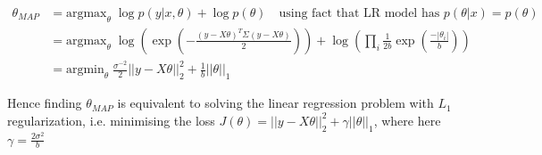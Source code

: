 %
%
\begin{answer}
\begin{align*}
\theta_{MAP} &= \text{argmax}_\theta\;  \log p(y | x, \theta) + \log p(\theta) \quad \text{using fact that LR model has } p(\theta | x) = p(\theta) 
\\
&= \text{argmax}_\theta\; \log \left( \exp(-\frac{(y - X \theta)^T \Sigma (y - X \theta)}{2}) \right ) + \log ( \prod_i \frac{1}{2b} \exp \left ( \frac{- |\theta_i|}{b} \right) )
\\
&= \text{argmin}_\theta\; \frac{\sigma^{-2}}{2} ||y - X \theta||_2^2 + \frac{1}{b} ||\theta||_1
\end{align*}

Hence finding $\theta_{MAP}$ is equivalent to solving the linear regression problem with $L_1$ regularization, i.e. minimising the loss $J(\theta) = ||y - X \theta ||_2^2 + \gamma || \theta ||_1$, where here $\gamma = \frac{2 \sigma^2}{b}$
\end{answer}
%

